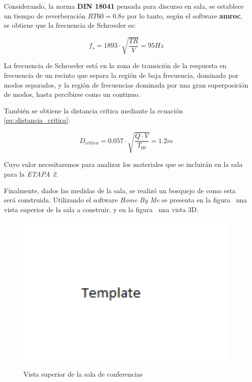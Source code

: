 \par Considerando, la norma \textbf{DIN 18041} pensada para discurso en sala, se establece un tiempo de reverberación $RT60 = 0.8s$ por lo tanto, según el software \textbf{amroc}, se obtiene que la frecuencia de Schroeder es:

\begin{equation}
    \boxed{f_s = 1893 \cdot \sqrt{\frac{TR}{V}} = 95Hz}
    \label{eq::freq_schroeder}
\end{equation}

\par La frecuencia de Schroeder está en la zona de transición de la respuesta en frecuencia de un recinto que separa la región de baja frecuencia, dominada por modos separados, y la región de frecuencias dominada por una gran superposición de modos, hasta percibirse como un continuo.

\par También se obtiene la distancia crítica mediante la ecuación \eqref{eq::distancia_critica}:

\begin{equation}
    \boxed{D_{crítica} = 0.057 \cdot \sqrt{ \frac{Q \cdot V}{T_{60}}}= 1.2m}
    \label{eq::distancia_critica}
\end{equation}

\par Cuyo valor necesitaremos para analizar los materiales que se incluirán en la sala para la \textit{ETAPA 2}.\\

\par Finalmente, dados las medidas de la sala, se realizó un bosquejo de como esta será construida. Utilizando el software \textit{Home By Me} se presenta en la figura~ una vista superior de la sala a construir, y en la figura ~una vista 3D.

\begin{figure}[H]
	\centering
	\includegraphics[width=1\textwidth]{./img/sala.png}
	\caption{Vista superior de la sala de conferencias}
	\label{fig:vista_sup_sala}
\end{figure}


